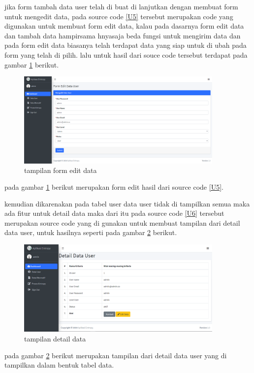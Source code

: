 
	jika form tambah data user telah di buat di lanjutkan dengan membuat form untuk mengedit data, pada source code \ref{U5} tersebut merupakan code yang digunakan untuk membuat form edit data, kalau pada dasarnya form edit data dan tambah data hampirsama hnyasaja beda fungsi untuk mengirim data dan pada form edit data biasanya telah terdapat data yang siap untuk di ubah pada form yang telah di pilih. lalu untuk hasil dari souce code tersebut terdapat pada gambar \ref{ve15} berikut.\par
\begin{figure}[!htbp]
	\centerline{\includegraphics[width=0.90\textwidth]{figures/us/edit.png}}
	\caption{tampilan form edit data}
	\label{ve15}
\end{figure}
 pada gambar \ref{ve15} berikut merupakan form edit hasil dari source code \ref{U5}.

kemudian dikarenakan pada tabel user data user tidak di tampilkan semua maka ada fitur untuk detail data maka dari itu pada source code \ref{U6} tersebut merupakan source code yang di gunakan untuk membuat tampilan dari detail data user, untuk hasilnya seperti pada gambar \ref{ve16} berikut.\par
\begin{figure}[!htbp]
	\centerline{\includegraphics[width=0.90\textwidth]{figures/us/detail.png}}
	\caption{tampilan detail data}
	\label{ve16}
\end{figure}
pada gambar \ref{ve16} berikut merupakan tampilan dari detail data user yang di tampilkan dalam bentuk tabel data.


